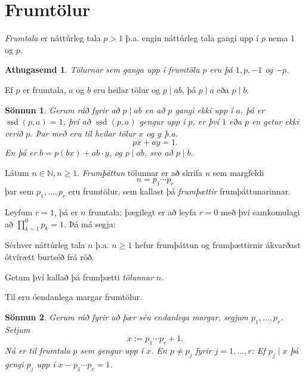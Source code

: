 \documentclass[a4paper,icelandic,11pt]{book}
\theoremstyle{plain}
\newtheorem*{ath}{Athugasemd}
\newtheorem*{sonnun}{Sönnun}
\newcommand{\N}{\mathbb{N}}
\DeclareMathOperator{\ssd}{ssd} %
\begin{document}
\section{Frumtölur}
\begin{skilgr}
  \emph{Frumtala} er náttúrleg tala $p>1$ þ.a. engin náttúrleg tala
  gangi upp í $p$ nema $1$ og $p$.
\end{skilgr}
\begin{ath}
  Tölurnar sem ganga upp í frumtölu $p$ eru þá $1,p,-1$ og $-p$.
\end{ath}
\begin{hjalparsetn}
  Ef $p$ er frumtala, $a$ og $b$ eru heilar tölur og $p \mid ab$, þá $p\mid a$
  eða $p\mid b$.
\end{hjalparsetn}
\begin{sonnun}
  Gerum ráð fyrir að $p\mid ab$ en að $p$ gangi ekki upp í $a$, þá er $\ssd(p,a) =
  1$, því að $\ssd(p,a)$ gengur upp í $p$, er því $1$ eða $p$ en getur ekki
  verið $p$. Þar með eru til heilar tölur $x$ og $y$ þ.a.
  \[ px + ay = 1 . \]
  En þá er $ b =  p(bx) + ab\cdot y$, og $p\mid ab$, svo að $p\mid b$.
\end{sonnun}
\begin{skilgr}
  Látum $n\in\N,n\ge 1$. \emph{Frumþáttun}
  tölunnar er að
  skrifa $n$ sem margfeldi
  \[ n = p_1 \cdots p_r \]
  þar sem $p_1, \dots , p_r$ eru frumtölur, sem kallast þá \emph{frumþættir}
  frumþáttunarinnar.
\end{skilgr}
Leyfum $r = 1$, þá er $n$ frumtala; þægilegt er að leyfa $r = 0$ með því
samkomulagi að $\prod_{k=1}^0 p_k = 1$. Þá má segja:
\begin{setn}
  Sérhver náttúrleg tala $n$ þ.a. $n\ge 1$ hefur frumþáttun og frumþættirnir
  ákvarðast ótvírætt burtséð frá röð.
\end{setn}
\begin{skilgr}
  Getum því kallað þá frumþætti \emph{tölunnar} $n$.
\end{skilgr}
\begin{setn}
  [Evklíð]
  Til eru óendanlega margar frumtölur.
\end{setn}
\begin{sonnun}
  Gerum ráð fyrir að þær séu endanlega margar, segjum $p_1,\dots,p_r$. Setjum \[
  x := p_1\cdots p_r +1.
  \]
  Nú er til frumtala $p$ sem gengur upp í $x$. En $p\neq p_j$ fyrir
  $j=1,\dots,r$: Ef $p_j\mid x$ þá gengi $p_j$ upp í $x-p_1\cdots p_r=1$.
\end{sonnun}
\end{document}

